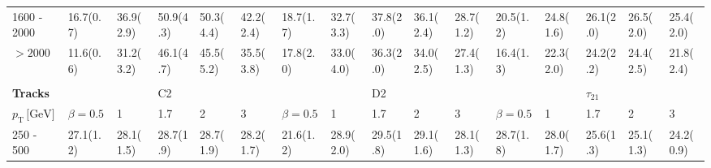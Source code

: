 \begin{table}
{\begin{tabular}{llllllllllllllll}
\multicolumn{1}{l||}{1600 - 2000} & \multicolumn{1}{l|}{16.7(0.7)} & \multicolumn{1}{l|}{36.9(2.9)} & \multicolumn{1}{l|}{50.9(4.3)} &    \multicolumn{1}{l|}{50.3(4.4)} & 						\multicolumn{1}{l||}{42.2(2.4)} & \multicolumn{1}{l|}{18.7(1.7)} & \multicolumn{1}{l|}{32.7(3.3)} & 						\multicolumn{1}{l|}{37.8(2.0)} & 					\multicolumn{1}{l|}{36.1(2.4)} & 	\multicolumn{1}{l||}{28.7(1.2)} & 					\multicolumn{1}{l|}{20.5(1.2)} & 	\multicolumn{1}{l|}{24.8(1.6)} & \multicolumn{1}{l|}{26.1(2.0)} & \multicolumn{1}{l|}{26.5(2.0)} & \multicolumn{1}{l|}{25.4(2.0)} \\
\multicolumn{1}{l||}{$>2000$} & 	\multicolumn{1}{l|}{11.6(0.6)} & \multicolumn{1}{l|}{31.2(3.2)} & \multicolumn{1}{l|}{46.1(4.7)} &    \multicolumn{1}{l|}{45.5(5.2)} & 						\multicolumn{1}{l||}{35.5(3.8)} & \multicolumn{1}{l|}{17.8(2.0)} & \multicolumn{1}{l|}{33.0(4.0)} & 						\multicolumn{1}{l|}{36.3(2.0)} & 					\multicolumn{1}{l|}{34.0(2.5)} & 	\multicolumn{1}{l||}{27.4(1.3)} & 					\multicolumn{1}{l|}{16.4(1.3)} & 	\multicolumn{1}{l|}{22.3(2.0)} & \multicolumn{1}{l|}{24.2(2.2)} & \multicolumn{1}{l|}{24.4(2.5)} & \multicolumn{1}{l|}{21.8(2.4)} \\ \hline
 &  &  &  &  &  &  &  &  &  &  &  &  &  &  &  \\
 \multicolumn{1}{l||}{\textbf{Tracks}} &  &  & C2 &  & \multicolumn{1}{l||}{} &  &  & D2 &  & \multicolumn{1}{l||}{} &  &  & $\tau_{21}$ &  & \multicolumn{1}{l|}{} \\ \hline
\multicolumn{1}{l||}{$p_{\mathrm{T}} \, \text{[GeV]}$}  & \multicolumn{1}{l|}{$\beta=0.5$} & \multicolumn{1}{l|}{1} & \multicolumn{1}{l|}{1.7} & \multicolumn{1}{l|}{2} & \multicolumn{1}{l||}{3} & \multicolumn{1}{l|}{$\beta=0.5$} & \multicolumn{1}{l|}{1} & \multicolumn{1}{l|}{1.7} & \multicolumn{1}{l|}{2} & \multicolumn{1}{l||}{3} & \multicolumn{1}{l|}{$\beta=0.5$} & \multicolumn{1}{l|}{1} & \multicolumn{1}{l|}{1.7} & \multicolumn{1}{l|}{2} & \multicolumn{1}{l|}{3} \\ \hline \hline
\multicolumn{1}{l||}{250 - 500} & 	\multicolumn{1}{l|}{27.1(1.2)} & \multicolumn{1}{l|}{28.1(1.5)} & \multicolumn{1}{l|}{28.7(1.9)} 						& \multicolumn{1}{l|}{28.7(1.9)} 					& \multicolumn{1}{l||}{28.2(1.7)} & \multicolumn{1}{l|}{21.6(1.2)} & \multicolumn{1}{l|}{28.9(2.0)} & \multicolumn{1}{l|}{29.5(1.8)} 		& \multicolumn{1}{l|}{29.1(1.6)} & \multicolumn{1}{l||}{28.1(1.3)} & \multicolumn{1}{l|}{28.7(1.8)} & \multicolumn{1}{l|}{28.0(1.7)} & \multicolumn{1}{l|}{25.6(1.3)} & \multicolumn{1}{l|}{25.1(1.3)} & \multicolumn{1}{l|}{24.2(0.9)} \\

\end{tabular}}
\end{table}
